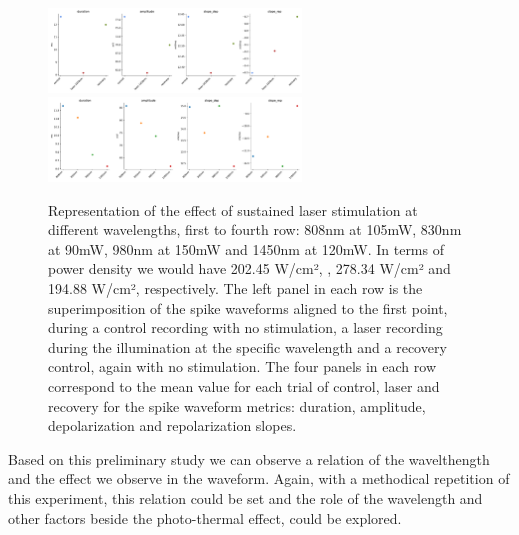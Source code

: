 \begin{figure}[hbt!]
	\includegraphics[width=0.6\textwidth]{img/laser/wavelength/1450nmmetrics.pdf}
	\centering
	\includegraphics[width=0.6\textwidth]{img/laser/wavelength/allmetrics.pdf}
	\caption{Representation of the effect of sustained laser stimulation at different wavelengths, first to fourth row: 808nm at 105mW, 830nm at 90mW, 980nm at 150mW and 1450nm at 120mW. In terms of power density we would have 202.45 W/cm²,  ,  278.34 W/cm² and 194.88 W/cm², respectively. The left panel in each row is the superimposition of the spike waveforms aligned to the first point, during a control recording with no stimulation, a laser recording during the illumination at the specific wavelength and a recovery control, again with no stimulation. The four panels in each row correspond to the mean value for each trial of control, laser and recovery for the spike waveform metrics: duration, amplitude, depolarization and repolarization slopes.}
    \label{fig:wavelengths results}
\end{figure}
Based on this preliminary study we can observe a relation of the wavelthength and the effect we observe in the waveform. Again, with a methodical repetition of this experiment, this relation could be set and the role of the wavelength and other factors beside the photo-thermal effect, could be explored.